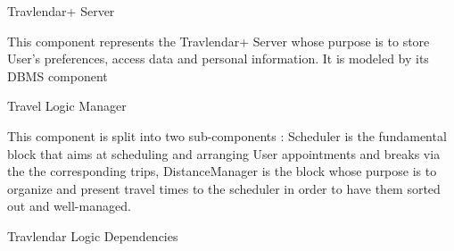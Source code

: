 \documentclass[12pt, a4paper]{article}
\begin{document}
\begin{description}
Travlendar+ Server

This component represents the Travlendar+ Server whose  purpose is to store User's preferences, access data and personal information. It is modeled by its DBMS component

Travel Logic Manager

This component is split into two sub-components : Scheduler is the fundamental block that aims at scheduling and arranging User appointments and breaks via the the corresponding trips, DistanceManager is the block whose purpose is to organize and present travel times to the scheduler in order to have them sorted out and well-managed.

Travlendar Logic Dependencies







\end{description}
 
\end{document}
